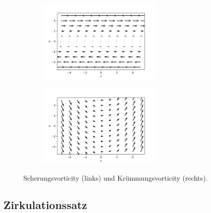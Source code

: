 \documentclass{book}
\begin{document}
\begin{figure}
\centering
\begin{subfigure}[c]{.4\textwidth}
\centering
\includegraphics[height = 4cm]{figs/shear_vorticity.png}
\end{subfigure}
\begin{subfigure}[c]{.4\textwidth}
\centering
\includegraphics[height = 4cm]{figs/curvature_vorticity.png}
\end{subfigure}
\caption{Scherungsvorticity (links) und Krümmungsvorticity (rechts).}
\end{figure}

\subsection{Zirkulationssatz}
\label{sec:zirkulationssatz}
\end{document}

